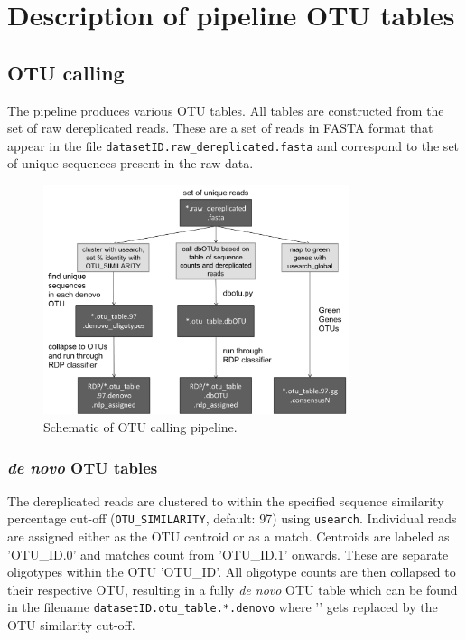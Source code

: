 \documentclass[11pt, oneside]{article}   	%
\begin{document}
\section{Description of pipeline OTU tables}

\subsection{OTU calling}
The pipeline produces various OTU tables.  All tables are constructed from the set of raw dereplicated reads.  These are a set of reads in FASTA format that appear in the file {\tt datasetID.raw\_dereplicated.fasta} and correspond to the set of unique sequences present in the raw data.  

\begin{figure}
\centering
	\includegraphics[width=0.8\textwidth]{figs/OTU_calling.png}
\caption{Schematic of OTU calling pipeline.}
\end{figure}


\subsubsection{\textit{de novo} OTU tables}
The dereplicated reads are clustered to within the specified sequence similarity percentage cut-off ({\tt OTU\_SIMILARITY}, default: 97) using {\tt usearch}.  Individual reads are assigned either as the OTU centroid or as a match. Centroids are labeled as 'OTU\_ID.0' and matches count from 'OTU\_ID.1' onwards.  These are separate oligotypes within the OTU 'OTU\_ID'. All oligotype counts are then collapsed to their respective OTU, resulting in a fully \textit{de novo} OTU table which can be found in the filename {\tt datasetID.otu\_table.*.denovo} where '{\tt *}' gets replaced by the OTU similarity cut-off.
\end{document}
